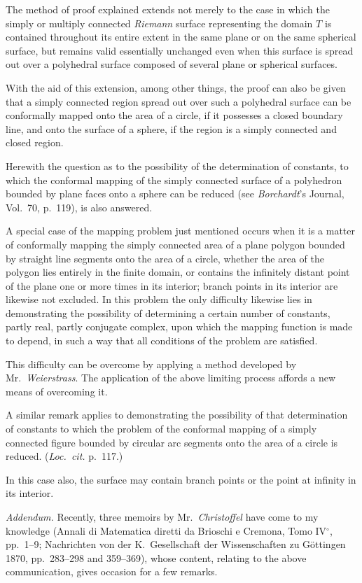 \documentclass{article}
\begin{document}
The method of proof explained extends not merely to the case in which the simply or multiply connected \emph{Riemann} surface representing the domain $T$ is contained throughout its entire extent in the same plane or on the same spherical surface, but remains valid essentially unchanged even when this surface is spread out over a polyhedral surface composed of several plane or spherical surfaces.

With the aid of this extension, among other things, the proof can also be given that a simply connected region spread out over such a polyhedral surface can be conformally mapped
onto the area of a circle, if it possesses a closed boundary line, and onto the surface of a sphere, if the region is a simply connected and closed region.

Herewith the question as to the possibility of the determination of constants, to which the conformal mapping of the simply connected surface of a polyhedron bounded by plane faces onto a sphere can be reduced (see \emph{Borchardt}'s Journal, Vol.~70, p.~119), is also answered.

A special case of the mapping problem just mentioned occurs when it is a matter of conformally mapping the simply connected area of a plane polygon bounded by straight line segments onto the area of a circle, whether the area of the polygon lies entirely in the finite domain, or contains the infinitely distant point of the plane one or more times in its interior; branch points in its interior are likewise not excluded. In this problem the only difficulty likewise lies in demonstrating the possibility of determining a certain number of constants, partly real, partly conjugate complex, upon which the mapping function is made to depend, in such a way that all conditions of the problem are satisfied.

This difficulty can be overcome by applying a method developed by Mr.~\emph{Weierstrass}. The application of the above limiting process affords a new means of overcoming it.

A similar remark applies to demonstrating the
possibility of that determination of constants to which the problem of the conformal mapping of a simply connected figure bounded by circular arc segments onto the area of a circle is reduced. (\emph{Loc.~cit.} p.~117.)

In this case also, the surface may contain branch points or the point at infinity in its interior.

\emph{Addendum.} Recently, three memoirs by Mr.~\emph{Christoffel} have come to my knowledge (Annali di Matematica diretti da Brioschi e Cremona, Tomo IV${}^\circ$, pp.~1--9; Nachrichten von der K.~Gesellschaft der Wissenschaften zu Göttingen 1870, pp.~283--298 and 359--369), whose content, relating to the above communication, gives occasion for a few remarks.
\end{document}
